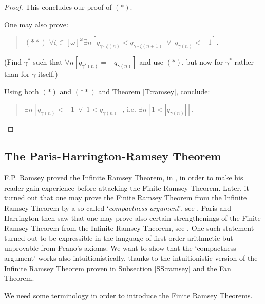 \documentclass[a4paper]{amsart}
\theoremstyle{plain}
\begin{document}
\begin{proof}
	 This concludes our proof of $(\ast)$. 
	 
	 \smallskip One may also prove: 
	 \begin{quote} $(\ast\ast)$ $\forall \zeta \in [\omega]^\omega\exists n[q_{\gamma\circ\zeta(n)}< q_{\gamma\circ\zeta(n+1)} \;\vee \;  q_{\gamma(n)}<-1]$. \end{quote}
	 
	 (Find $\gamma^\ast$ such that $\forall n[q_{\gamma^\ast(n)}=-q_{\gamma(n)}]$ and use $(\ast)$, but now for $\gamma^\ast$ rather than for $\gamma$ itself.)
	 
	 \smallskip Using both $(\ast)$ and $(\ast\ast)$ and Theorem \ref{T:ramsey}, conclude: \begin{quote} $\exists n[q_{\gamma(n)}<-1\;\vee\; 1<q_{\gamma(n)}]$, i.e. $\exists n[1<|q_{\gamma(n)}|]$. \end{quote} 
	 
	 
	 \end{proof}
	 
	 
\subsection{The Paris-Harrington-Ramsey  Theorem}\label{SS:phr}
F.P.  Ramsey proved the Infinite Ramsey Theorem, in \cite{ramsey}, in order to make his reader  gain experience before attacking the Finite Ramsey Theorem. Later, it turned out that one may prove the Finite Ramsey Theorem from the Infinite Ramsey Theorem  by a so-called `{\it compactness argument}', see \cite{debruijnerdos}.  Paris and Harrington then saw that one may prove also certain strengthenings of the Finite Ramsey Theorem from the Infinite Ramsey Theorem, see \cite[Sections 1.5 and 6.3]{graham}.  One such statement turned out to be expressible in the language of first-order arithmetic but unprovable from Peano's axioms. We want to show that the `compactness argument' works also intuitionistically, thanks to the intuitionistic version of the Infinite Ramsey Theorem proven in Subsection \ref{SS:ramsey} and the Fan Theorem. 

We need some terminology in order to introduce the Finite Ramsey Theorems. 
\end{document}
